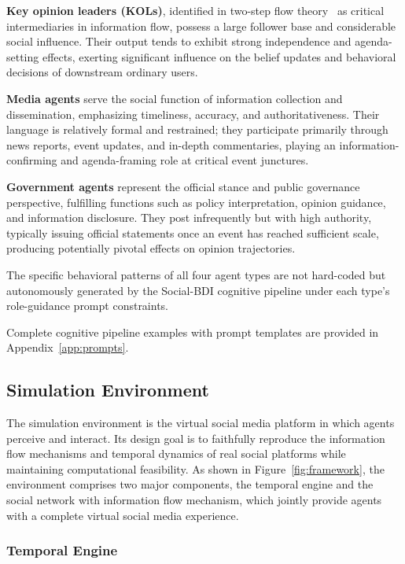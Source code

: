 \documentclass[a4paper,fleqn]{cas-dc}
\begin{document}
\textbf{Key opinion leaders (KOLs)}, identified in two-step flow theory~\citep{katz_personal_1955} as critical intermediaries in information flow, possess a large follower base and considerable social influence. Their output tends to exhibit strong independence and agenda-setting effects, exerting significant influence on the belief updates and behavioral decisions of downstream ordinary users.

\textbf{Media agents} serve the social function of information collection and dissemination, emphasizing timeliness, accuracy, and authoritativeness. Their language is relatively formal and restrained; they participate primarily through news reports, event updates, and in-depth commentaries, playing an information-confirming and agenda-framing role at critical event junctures.

\textbf{Government agents} represent the official stance and public governance perspective, fulfilling functions such as policy interpretation, opinion guidance, and information disclosure. They post infrequently but with high authority, typically issuing official statements once an event has reached sufficient scale, producing potentially pivotal effects on opinion trajectories.

The specific behavioral patterns of all four agent types are not hard-coded but autonomously generated by the Social-BDI cognitive pipeline under each type's role-guidance prompt constraints.

Complete cognitive pipeline examples with prompt templates are provided in Appendix~\ref{app:prompts}.

\subsection{Simulation Environment}\label{subsec:env}

The simulation environment is the virtual social media platform in which agents perceive and interact. Its design goal is to faithfully reproduce the information flow mechanisms and temporal dynamics of real social platforms while maintaining computational feasibility. As shown in Figure~\ref{fig:framework}, the environment comprises two major components, the temporal engine and the social network with information flow mechanism, which jointly provide agents with a complete virtual social media experience.

\subsubsection{Temporal Engine}
\end{document}
